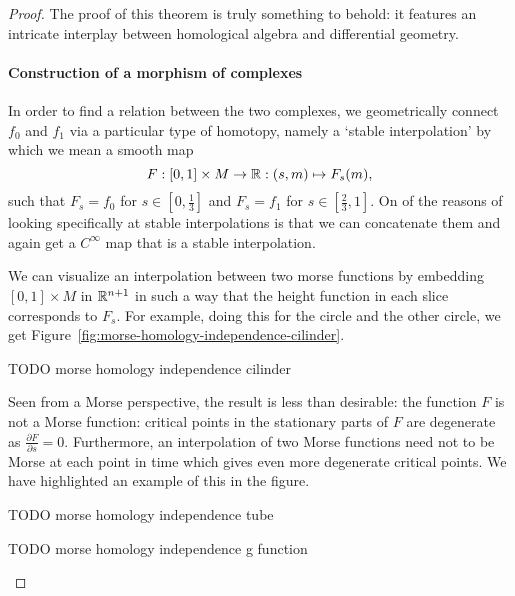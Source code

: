 \begin{proof}
The proof of this theorem is truly something to behold: it features an intricate interplay between homological algebra and differential geometry.
\paragraph{Construction of a morphism of complexes}
In order to find a relation between the two complexes, we geometrically connect $f_0$ and $f_1$ via a particular type of homotopy, namely  a `stable interpolation' by which we mean a smooth map
\[
    F: [0,1] \times M \to \mathbb{R}: (s, m) \mapsto F_s(m)
,\] 
such that $F_s = f_0$ for $s \in \left[0, \frac{1}{3}\right]$ and $F_s = f_1$ for $s \in \left[\frac{2}{3}, 1\right]$.
On of the reasons of looking specifically at stable interpolations is that we can concatenate them and again get a $C^{\infty}$ map that is a stable interpolation.

We can visualize an interpolation between two morse functions by embedding $[0,1] \times M$ in $\mathbb{R}^{n+1}$ in such a way that the height function in each slice corresponds to $F_s$.
For example, doing this for the circle and the other circle, we get Figure~\ref{fig:morse-homology-independence-cilinder}.

\begin{marginfigure}
    \centering
    \caption{TODO morse homology independence cilinder}
    \label{fig:morse-homology-independence-cilinder}
\end{marginfigure}

Seen from a Morse perspective, the result is less than desirable: the function $F$ is not a Morse function: critical points in the stationary parts of $F$ are degenerate as $\frac{\partial F}{\partial s} = 0$.
Furthermore, an interpolation of two Morse functions need not to be Morse at each point in time which gives even more degenerate critical points. We have highlighted an example of this in the figure.

\begin{marginfigure}
    \centering
    \caption{TODO morse homology independence tube}
    \label{fig:morse-homology-independence-tube}
\end{marginfigure}

\begin{marginfigure}
    \centering
    \caption{TODO morse homology independence g function}
    \label{fig:morse-homology-independence-g-function}
\end{marginfigure}


\end{proof}
